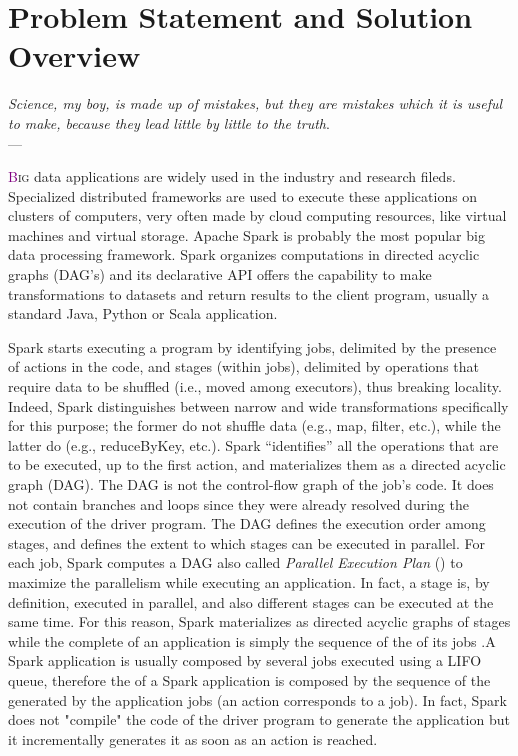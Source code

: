 \chapter{Problem Statement and Solution Overview} \label{chap:ProblemAndSolution}
\begin{flushright}{\slshape    
   Science, my boy, is made up of mistakes, but they are mistakes
   which it is useful to make, because they lead little by little
   to the truth}. \\ \medskip --- \citeauthor{verne_journey:1957}
    \citeyear{verne_journey:1957}
\end{flushright} 

\lettrine[lines=4]{\textcolor{purple}{B}}{ig} data applications are widely used in the industry and research fileds. Specialized   distributed frameworks are used to execute these applications on clusters of computers, very often made by cloud computing resources, like virtual machines and virtual storage. Apache Spark is probably the most popular big data processing framework. Spark organizes computations in directed acyclic graphs (DAG's) and its declarative API offers the capability to make transformations to datasets and return results to the client program, usually a standard Java, Python or Scala application. 

Spark starts executing a program by identifying jobs, delimited by the presence of actions in the code, and stages (within jobs), delimited by operations that require data to be shuffled (i.e., moved among executors), thus breaking locality. Indeed, Spark distinguishes
between narrow and wide transformations specifically for this purpose; the former do not shuffle data (e.g., map, filter, etc.), while the latter do (e.g., reduceByKey, etc.). Spark “identifies” all the operations that are to be executed, up to the first action, and
materializes them as a directed acyclic graph (DAG). The DAG is not the control-flow graph of the job’s code. It does not contain branches and loops since they were already resolved during the execution of the driver program. The DAG defines the execution order among stages, and defines the extent to which stages can be executed in parallel. For each job, Spark computes a DAG also called \textit{Parallel Execution Plan} (\plan) to maximize the parallelism while executing an application. In fact, a stage is, by definition, executed in parallel, and also different stages can be executed at the same time. For this reason, Spark materializes \plans as directed acyclic graphs of stages while the complete \model of an application is simply the sequence of the \plans of its jobs .A Spark application is usually composed by several jobs executed using a LIFO queue, therefore the \model of a Spark application is composed by the sequence of the \plans generated by the application jobs (an action corresponds to a job). In fact, Spark does not "compile" the code of the driver program to generate the application \model but it incrementally generates it as soon as an action is reached.

